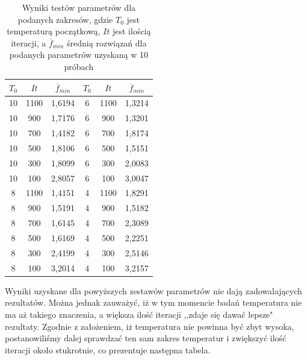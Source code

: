 \documentclass[twoside]{projektInzynierskiMS1}
\newcommand{\si}{ś}
\begin{document}
\begin{table}[htbp]\centering
\def\sym#1{\ifmmode^{#1}\else\(^{#1}\)\fi}
\caption{Wyniki testów parametrów dla podanych zakresów, gdzie $T_0$ jest temperaturą początkową, $It$ jest ilo\si cią iteracji, a $\overline{f}_{min}$ \si rednią rozwiązań dla podanych parametrów uzyskaną w 10 próbach}
\renewcommand\arraystretch{1.333}
\begin{tabular}{|c|c|c||c|c|c|} 
                  \hline
                  $T_0$
                  & $It$
                  & $\overline{f}_{min}$ 
& $T_0$
 & $It$
 & $\overline{f}_{min}$ \\ \hline

10 & 1100 & 1,6194 &6 & 1100 & 1,3214 \\ \hline 
10 & 900 & 1,7176 &6 & 900 & 1,3201 \\ \hline 
10 & 700 & 1,4182&6 & 700 & 1,8174 \\ \hline 
10 & 500 & 1,8106&6 & 500 & 1,5151 \\ \hline 
10 & 300 & 1,8099 &6 & 300 & 2,0083 \\ \hline 
10 & 100 & 2,8057&6 & 100 & 3,0047 \\ \Xhline{3\arrayrulewidth}

8 & 1100 & 1,4151 &4 & 1100 & 1,8291 \\ \hline
8 & 900 & 1,5191 & 4 & 900 & 1,5182 \\ \hline
8 & 700 & 1,6145 &4 & 700 & 2,3089 \\ \hline
8 & 500 & 1,6169 &4 & 500 & 2,2251 \\ \hline
8 & 300 & 2,4199 &4 & 300 & 2,5146 \\ \hline 
8 & 100 & 3,2014 &4 & 100 & 3,2157 \\ \hline 


\end{tabular}
\end{table}


Wyniki uzyskane dla powyższych zestawów parametrów nie dają zadowalających rezultatów. Można jednak zauważyć, iż w tym momencie badań temperatura nie ma aż takiego znaczenia, a większa ilo\si ć iteracji ,,zdaje się dawać lepsze" rezultaty. Zgodnie z założeniem, iż temperatura nie powinna być zbyt wysoka, postanowili\si my dalej sprawdzać ten sam zakres temperatur i zwiększyć ilo\si ć iteracji około stukrotnie, co prezentuje następna tabela.
\end{document}
